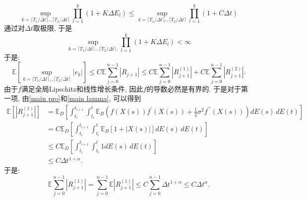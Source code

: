 \documentclass[12pt, final]{article}
\makeatletter
\numberwithin{equation}{section}
\numberwithin{figure}{section}
\numberwithin{table}{section}
\theoremstyle{plain}
\renewcommand{\proofname}{证明}
\theoremstyle{Definition}
\theoremstyle{Remark}
\renewenvironment{proof}[1][\proofname]{\par
	\pushQED{\qed}%
	\normalfont \topsep6\p@\@plus6\p@\relax
	\trivlist\item[\hskip\labelsep
	\bfseries #1\@addpunct{\, :\, }]\ignorespaces
}{%
	\popQED\endtrivlist\@endpefalse
}
\makeatother
\begin{document}
\begin{proof}
		\begin{equation*}
			\sup\limits_{k=\lceil T_1/\Delta t \rceil \ldots \lceil T_2/\Delta t \rceil} \prod\limits_{l=1}^{k}(1+K\Delta E_l) \le \sup\limits_{k=\lceil T_1/\Delta t \rceil \ldots \lceil T_2/\Delta t \rceil} \prod\limits_{l=1}^{k}(1+C\Delta t)
		\end{equation*}
		通过对$\Delta t$取极限, 
		于是
		\begin{equation*}
			\sup\limits_{k=\lceil T_1/\Delta t \rceil \ldots \lceil T_2/\Delta t \rceil. } \prod\limits_{l=1}^{k}(1+K\Delta E_l) < \infty
		\end{equation*}
		于是:
		\begin{equation}
			\mathbb{E}\left[\sup\limits_{k=\lceil T_1/\Delta t \rceil \ldots \lceil T_2/\Delta t \rceil}\left|e_k\right|\right] \leq C\mathbb{E}\sum_{j=0}^{n-1}|R_{j+1}| \leq C\mathbb{E}\sum\limits_{j=0}^{n-1}|R_{j+1}^{(1)}| + C\mathbb{E}\sum\limits_{j=0}^{n-1}|R_{j+1}^{(2)}|. 
		\end{equation}
		由于$f$满足全局Lipschitz和线性增长条件, 因此$f$的导数必然是有界的. 
		于是对于第一项,  由\cref{main pro}和\cref{main lamma}, 可以得到
		\begin{align*}
			\mathbb{E} \left[|R_{j+1}^{(1)}| \right] &= \mathbb{E}_D \left[
			  \int_{t_i}^{t_{i+1}} \int_{t_i}^{t}  \mathbb{E}_B \left( f(X(s)) f^{\prime}(X(s)) + \frac{1}{2} \sigma^2 f^{\prime\prime}(X(s)) \right) dE(s) \, dE(t)
			 \right] \\
			 &= C\mathbb{E}_D \left[
			 \int_{t_i}^{t_{i+1}} \int_{t_i}^{t}  \mathbb{E}_B \left[1+|X(s)| \right] dE(s) \, dE(t)
			 \right] \\
			 & \le C\mathbb{E}_D \left[
			 \int_{t_i}^{t_{i+1}} \int_{t_i}^{t}  1 dE(s) \, dE(t)
			 \right] \\
			 &\le C\Delta t^{1+\alpha}. 
		\end{align*}
		于是:
		\begin{equation}
			\mathbb{E}\sum\limits_{j=0}^{n-1}|R_{j+1}^{(1)}|= \sum\limits_{j=0}^{n-1}\mathbb{E}|R_{j+1}^{(1)}| \leq
			C\sum\limits_{j=0}^{n-1}\Delta t^{1+\alpha} \le C\Delta t^\alpha. 
		\end{equation}


\end{proof}
\end{document}
